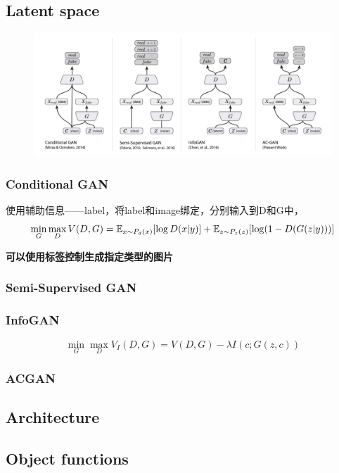 \subsection{Latent space}
\begin{figure}[H]
    \centering
    \includegraphics[width=16cm]{images/cgan_acgan.png}
    \label{fig:CGAN2ACGAN}
\end{figure}
\subsubsection{Conditional GAN}
使用辅助信息——label，将label和image绑定，分别输入到D和G中，
\begin{equation}
    \min_G \max_D V(D, G) = \mathbb{E}_{x \sim P_d(x)}[\log D(x|y)] + \mathbb{E}_{z \sim P_{z}(z)}[\log (1 - D(G(z|y)))]
\end{equation}

\textbf{可以使用标签控制生成指定类型的图片}
\subsubsection{Semi-Supervised GAN}


\subsubsection{InfoGAN}
\begin{equation}
    \min_G \max_D V_I(D, G) = V(D, G) - \lambda I(c; G(z,c))
\end{equation}

\subsubsection{ACGAN}

\subsection{Architecture}

\subsection{Object functions}

